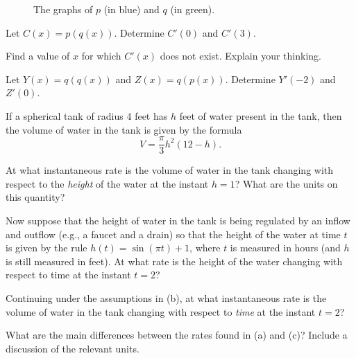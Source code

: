 \begin{exercises}
\begin{figure}[h]
\begin{center}
\caption{The graphs of $p$ (in blue) and $q$ (in green).} \label{F:2.5.Ez3}
\end{center}
\end{figure}
\ba
	\item Let $C(x) = p(q(x))$.  Determine $C'(0)$ and $C'(3)$.
	\item Find a value of $x$ for which $C'(x)$ does not exist.  Explain your thinking.
	\item Let $Y(x) = q(q(x))$ and $Z(x) = q(p(x))$.  Determine $Y'(-2)$ and $Z'(0)$.	
\ea
\item If a spherical tank of radius 4 feet has $h$ feet of water present in the tank, then the volume of water in the tank is given by the formula
$$V = \frac{\pi}{3} h^2(12-h).$$
\ba
	\item At what instantaneous rate is the volume of water in the tank changing with respect to the \emph{height} of the water at the instant $h = 1$?  What are the units on this quantity?
	\item Now suppose that the height of water in the tank is being regulated by an inflow and outflow (e.g., a faucet and a drain) so that the height of the water at time $t$ is given by the rule $h(t) = \sin(\pi t) + 1$, where $t$ is measured in hours (and $h$ is still measured in feet).  At what rate is the height of the water changing with respect to time at the instant $t = 2$?
	\item Continuing under the assumptions in (b), at what instantaneous rate is the volume of water in the tank changing with respect to \emph{time} at the instant $t = 2$?  
	\item What are the main differences between the rates found in (a) and (c)?  Include a discussion of the relevant units.
\ea
\end{exercises}
\afterexercises